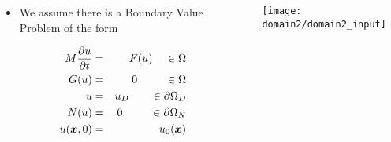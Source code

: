 \begin{frame}
  \begin{columns}[t]
    \begin{block}{}%
      \begin{itemize}
      \item We assume there is a Boundary Value Problem
      of the form %
      \end{itemize}
      \vspace{-.1in}
      \begin{eqnarray}
	\label{eqn:general_pde}
	\nonumber
	M \frac{\partial u}{\partial t} & = & F( u ) \;\;\;\; \in \Omega
        \\
	\nonumber
	G( u ) & = & 0 \;\;\;\;\;\;\;\;\; \in \Omega
	\\
	\nonumber
	u & = & u_D \;\;\;\;\;\;\; \in \partial \Omega_D
	\\
	\nonumber
	N(u) & = & 0 \;\;\;\;\;\;\;\;\; \in \partial \Omega_N
 	\\
 	\nonumber
 	u({\boldsymbol{x}}, 0) & = & u_0({\boldsymbol{x}}) 
      \end{eqnarray}
    \end{block}
      \begin{center}
	\texttt{[image: domain2/domain2\_input]}
      \end{center}
  \end{columns}
\end{frame}
